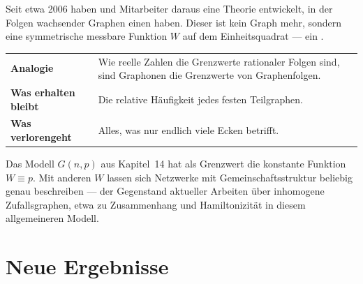 \begin{forschung}
Seit etwa 2006 haben  und Mitarbeiter daraus eine Theorie entwickelt, in der Folgen wachsender Graphen einen  haben. Dieser ist kein Graph mehr, sondern eine symmetrische messbare Funktion $W$ auf dem Einheitsquadrat --- ein .

\begin{center}
\renewcommand{\arraystretch}{1.5}
\begin{tabular}{@{}P{2.8cm}P{5.8cm}@{}}
\toprule
\textbf{Analogie} & Wie reelle Zahlen die Grenzwerte rationaler Folgen sind, sind Graphonen die Grenzwerte von Graphenfolgen.\\
\textbf{Was erhalten bleibt} & Die relative Häufigkeit jedes festen Teilgraphen.\\
\textbf{Was verlorengeht} & Alles, was nur endlich viele Ecken betrifft.\\
\bottomrule
\end{tabular}
\end{center}

Das Modell $G(n,p)$ aus Kapitel~14 hat als Grenzwert die konstante Funktion $W \equiv p$. Mit anderen $W$ lassen sich Netzwerke mit Gemeinschaftsstruktur beliebig genau beschreiben --- der Gegenstand aktueller Arbeiten über inhomogene Zufallsgraphen, etwa zu Zusammenhang und Hamiltonizität in diesem allgemeineren Modell.
\end{forschung}

\section{Neue Ergebnisse}

